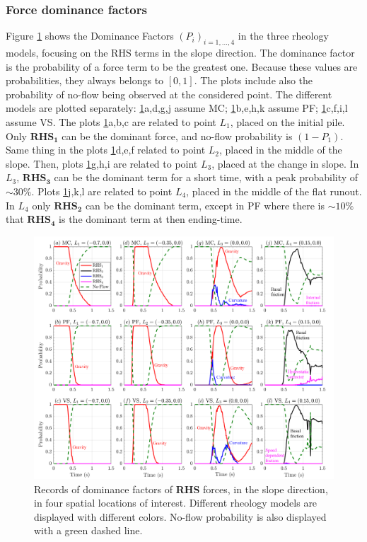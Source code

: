 \documentclass{article}
\begin{document}
\subsubsection{Force dominance factors}\label{stat1}
Figure \ref{fig:Ramp-Pr_x} shows the Dominance Factors $(P_i)_{i=1,\dots,4}$ in the three rheology models, focusing on the RHS terms in the slope direction. The dominance factor is the probability of a force term to be the greatest one. Because these values are probabilities, they always belongs to $[0,1]$. The plots include also the probability of no-flow being observed at the considered point. The different models are plotted separately: \ref{fig:Ramp-Pr_x}a,d,g,j assume MC; \ref{fig:Ramp-Pr_x}b,e,h,k assume PF; \ref{fig:Ramp-Pr_x}c,f,i,l assume VS. The plots \ref{fig:Ramp-Pr_x}a,b,c are related to point $L_1$, placed on the initial pile. Only $\boldsymbol{RHS_1}$ can be the dominant force, and no-flow probability is $(1-P_1)$. Same thing in the plots \ref{fig:Ramp-Pr_x}d,e,f related to point $L_2$, placed in the middle of the slope. Then, plots \ref{fig:Ramp-Pr_x}g,h,i are related to point $L_3$, placed at the change in slope. In $L_3$, $\boldsymbol{RHS_3}$ can be the dominant term for a short time, with a peak probability of $\sim 30\%$. Plots \ref{fig:Ramp-Pr_x}j,k,l are related to point $L_4$, placed in the middle of the flat runout. In $L_4$ only $\boldsymbol{RHS_2}$ can be the dominant term, except in PF where there is $\sim 10\%$ that $\boldsymbol{RHS_4}$ is the dominant term at then ending-time.
\begin{figure}[H]
         \centering
        \includegraphics[width=1\textwidth]{InclinedPlane/ForceContrib/Pr_x.png}
        \caption{Records of dominance factors of \textbf{RHS} forces, in the slope direction, in four spatial locations of interest. Different rheology models are displayed with different colors. No-flow probability is also displayed with a green dashed line.}
        \label{fig:Ramp-Pr_x}
\end{figure}
\end{document}
